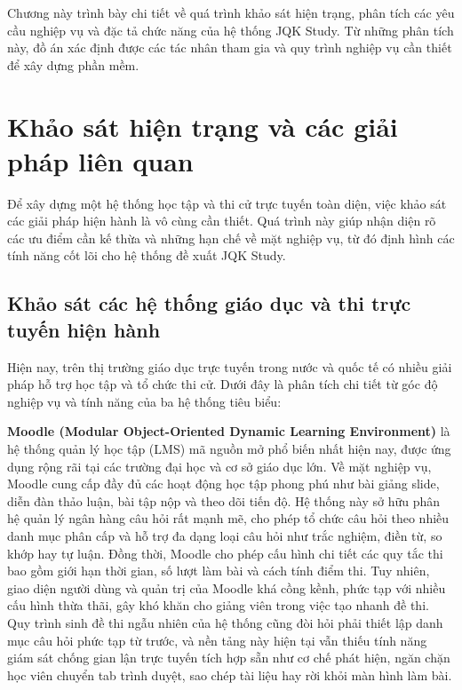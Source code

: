 \documentclass[../DoAn.tex]{subfiles}
\begin{document}
Chương này trình bày chi tiết về quá trình khảo sát hiện trạng, phân tích các yêu cầu nghiệp vụ và đặc tả chức năng của hệ thống JQK Study. Từ những phân tích này, đồ án xác định được các tác nhân tham gia và quy trình nghiệp vụ cần thiết để xây dựng phần mềm.

\section{Khảo sát hiện trạng và các giải pháp liên quan}
\label{section:2.1}

Để xây dựng một hệ thống học tập và thi cử trực tuyến toàn diện, việc khảo sát các giải pháp hiện hành là vô cùng cần thiết. Quá trình này giúp nhận diện rõ các ưu điểm cần kế thừa và những hạn chế về mặt nghiệp vụ, từ đó định hình các tính năng cốt lõi cho hệ thống đề xuất JQK Study.

\subsection{Khảo sát các hệ thống giáo dục và thi trực tuyến hiện hành}
\label{subsection:2.1.1}

Hiện nay, trên thị trường giáo dục trực tuyến trong nước và quốc tế có nhiều giải pháp hỗ trợ học tập và tổ chức thi cử. Dưới đây là phân tích chi tiết từ góc độ nghiệp vụ và tính năng của ba hệ thống tiêu biểu:

    \textbf{Moodle (Modular Object-Oriented Dynamic Learning Environment)} là hệ thống quản lý học tập (LMS) mã nguồn mở phổ biến nhất hiện nay, được ứng dụng rộng rãi tại các trường đại học và cơ sở giáo dục lớn. Về mặt nghiệp vụ, Moodle cung cấp đầy đủ các hoạt động học tập phong phú như bài giảng slide, diễn đàn thảo luận, bài tập nộp và theo dõi tiến độ. Hệ thống này sở hữu phân hệ quản lý ngân hàng câu hỏi rất mạnh mẽ, cho phép tổ chức câu hỏi theo nhiều danh mục phân cấp và hỗ trợ đa dạng loại câu hỏi như trắc nghiệm, điền từ, so khớp hay tự luận. Đồng thời, Moodle cho phép cấu hình chi tiết các quy tắc thi bao gồm giới hạn thời gian, số lượt làm bài và cách tính điểm thi. Tuy nhiên, giao diện người dùng và quản trị của Moodle khá cồng kềnh, phức tạp với nhiều cấu hình thừa thãi, gây khó khăn cho giảng viên trong việc tạo nhanh đề thi. Quy trình sinh đề thi ngẫu nhiên của hệ thống cũng đòi hỏi phải thiết lập danh mục câu hỏi phức tạp từ trước, và nền tảng này hiện tại vẫn thiếu tính năng giám sát chống gian lận trực tuyến tích hợp sẵn như cơ chế phát hiện, ngăn chặn học viên chuyển tab trình duyệt, sao chép tài liệu hay rời khỏi màn hình làm bài.
\end{document}
